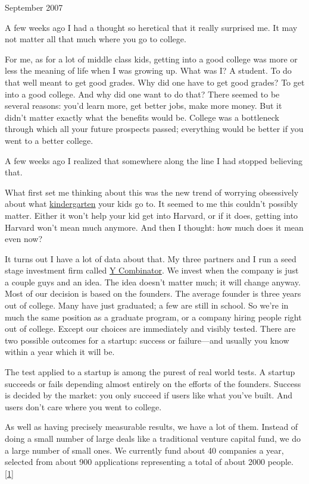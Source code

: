 September 2007

A few weeks ago I had a thought so heretical that it really surprised
me. It may not matter all that much where you go to college.

For me, as for a lot of middle class kids, getting into a good college
was more or less the meaning of life when I was growing up. What was I?
A student. To do that well meant to get good grades. Why did one have to
get good grades? To get into a good college. And why did one want to do
that? There seemed to be several reasons: you'd learn more, get better
jobs, make more money. But it didn't matter exactly what the benefits
would be. College was a bottleneck through which all your future
prospects passed; everything would be better if you went to a better
college.

A few weeks ago I realized that somewhere along the line I had stopped
believing that.

What first set me thinking about this was the new trend of worrying
obsessively about what
\href{http://nymag.com/nymetro/urban/education/features/15141/}{kindergarten}
your kids go to. It seemed to me this couldn't possibly matter. Either
it won't help your kid get into Harvard, or if it does, getting into
Harvard won't mean much anymore. And then I thought: how much does it
mean even now?

It turns out I have a lot of data about that. My three partners and I
run a seed stage investment firm called \href{http://ycombinator.com}{Y
Combinator}. We invest when the company is just a couple guys and an
idea. The idea doesn't matter much; it will change anyway. Most of our
decision is based on the founders. The average founder is three years
out of college. Many have just graduated; a few are still in school. So
we're in much the same position as a graduate program, or a company
hiring people right out of college. Except our choices are immediately
and visibly tested. There are two possible outcomes for a startup:
success or failure---and usually you know within a year which it will
be.

The test applied to a startup is among the purest of real world tests. A
startup succeeds or fails depending almost entirely on the efforts of
the founders. Success is decided by the market: you only succeed if
users like what you've built. And users don't care where you went to
college.

As well as having precisely measurable results, we have a lot of them.
Instead of doing a small number of large deals like a traditional
venture capital fund, we do a large number of small ones. We currently
fund about 40 companies a year, selected from about 900 applications
representing a total of about 2000 people. {[}\hyperref[f1n]{1}{]}

